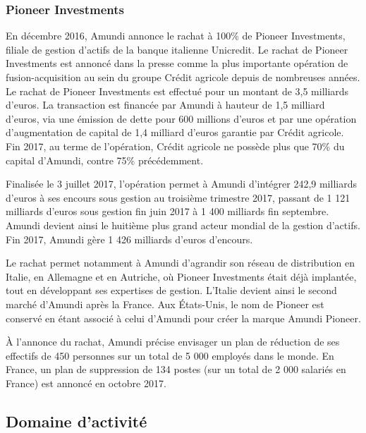 \subsubsection{Pioneer Investments}
\par En décembre 2016, Amundi annonce le rachat à 100\% de Pioneer Investments, filiale de gestion d'actifs de la banque italienne Unicredit. Le rachat de Pioneer Investments est annoncé dans la presse comme la plus importante opération de fusion-acquisition au sein du groupe Crédit agricole depuis de nombreuses années. Le rachat de Pioneer Investments est effectué pour un montant de 3,5 milliards d'euros. La transaction est financée par Amundi à hauteur de 1,5 milliard d'euros, via une émission de dette pour 600 millions d'euros et par une opération d'augmentation de capital de 1,4 milliard d'euros garantie par Crédit agricole. Fin 2017, au terme de l'opération, Crédit agricole ne possède plus que 70\% du capital d'Amundi, contre 75\% précédemment.
\par Finalisée le 3 juillet 2017, l'opération permet à Amundi d'intégrer 242,9 milliards d'euros à ses encours sous gestion au troisième trimestre 2017, passant de 1 121 milliards d'euros sous gestion fin juin 2017 à 1 400 milliards fin septembre. Amundi devient ainsi le huitième plus grand acteur mondial de la gestion d'actifs. Fin 2017, Amundi gère 1 426 milliards d'euros d'encours.
\par Le rachat permet notamment à Amundi d'agrandir son réseau de distribution en Italie, en Allemagne et en Autriche, où Pioneer Investments était déjà implantée, tout en développant ses expertises de gestion. L'Italie devient ainsi le second marché d'Amundi après la France. Aux États-Unis, le nom de Pioneer est conservé en étant associé à celui d'Amundi pour créer la marque Amundi Pioneer.
\par À l'annonce du rachat, Amundi précise envisager un plan de réduction de ses effectifs de 450 personnes sur un total de 5 000 employés dans le monde. En France, un plan de suppression de 134 postes (sur un total de 2 000 salariés en France) est annoncé en octobre 2017.

\subsection{Domaine d'activité}
